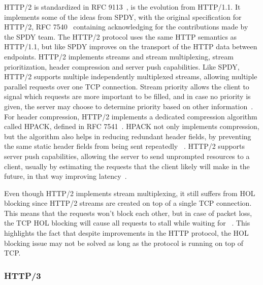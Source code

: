\documentclass[english, 12pt, a4paper, elec, utf8, a-2b, online]{aaltothesis}
\begin{document}
HTTP/2 is standardized in RFC 9113~\cite{rfc9113}, is the evolution from HTTP/1.1.
It implements some of the ideas from SPDY, with the original specification for
HTTP/2, RFC 7540~\cite{rfc7540} containing acknowledging for the contributions made by the SPDY
team. The HTTP/2 protocol uses the same HTTP semantics as HTTP/1.1, but like SPDY
improves on the transport of the HTTP data between endpoints. HTTP/2 implements
streams and stream multiplexing, stream prioritization, header compression and
server push capabilities. Like SPDY, HTTP/2 supports multiple independently
multiplexed streams, allowing multiple parallel requests over one TCP connection.
Stream priority allows the client to signal which requests are more important to
be filled, and in case no priority is given, the server may choose to determine
priority based on other information~\cite{rfc9113}. For header compression, HTTP/2 implements a
dedicated compression algorithm called HPACK, defined in RFC 7541~\cite{rfc7541}.
HPACK not only implements compression, but the algorithm also helps in reducing
redundant header fields, by preventing the same static header fields from
being sent repeatedly ~\cite{rfc7541}. HTTP/2 supports server push capabilities,
allowing the server to send unprompted resources to a client, usually by estimating
the requests that the client likely will make in the future, in that way improving
latency~\cite{rfc9114}.

Even though HTTP/2 implements stream multiplexing, it still suffers from HOL blocking
since HTTP/2 streams are created on top of a single TCP
connection. This means that the requests won't block each other, but in case of
packet loss, the TCP HOL blocking will cause all requests to stall while waiting
for ~\cite{rfc9113}. This highlights the fact that despite improvements in the
HTTP protocol, the HOL blocking issue may not be solved as long as the protocol
is running on top of TCP.

\subsubsection{HTTP/3}
\end{document}
